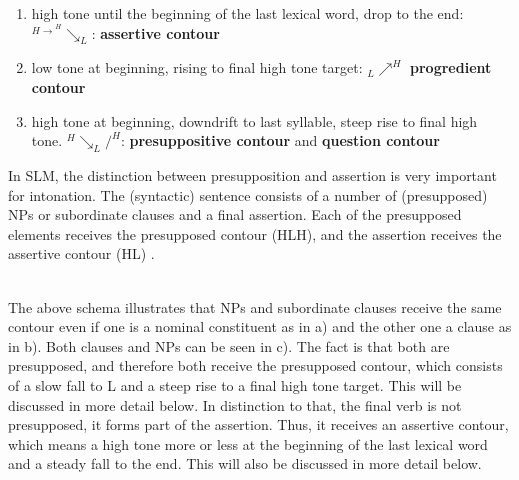 \begin{enumerate}
 \item high tone until the beginning of the last lexical word, drop to the end:  $^{H\longrightarrow}^H\searrow _L$: \textbf{assertive contour}
 \item low tone at beginning, rising to final high tone target: $_L\nearrow ^H$ \textbf{progredient contour}
 \item high tone at beginning, downdrift to last syllable, steep rise to final high tone. $^H\searrow _L / ^H$: \textbf{presuppositive contour} and \textbf{question contour}
\end{enumerate}

In SLM, the distinction between presupposition and assertion is very important for intonation. The (syntactic) sentence consists of a number of (presupposed) NPs or subordinate clauses and a final assertion. Each of the presupposed elements receives the presupposed contour (HLH), and the assertion receives the assertive contour (HL) .



 \\

The above schema illustrates that NPs and subordinate clauses receive the same contour even if one is a nominal constituent as in a) and the other one a clause as in b). Both clauses and NPs can be seen in c).  The fact is that both are presupposed, and therefore both receive the presupposed contour, which consists of a slow fall to L and a steep rise to a final high tone target. This will be discussed in more detail below. In distinction to that, the final verb is not presupposed, it forms part of the assertion. Thus, it receives an assertive contour, which means a high tone more or less at the beginning of the last lexical word and a steady fall to the end. This will also be discussed in more detail below.

